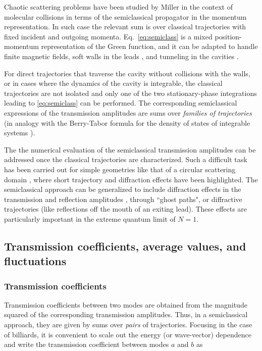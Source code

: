 \documentclass[a4paper,10pt]{article}
\newcommand{\nin}{\noindent}
\begin{document}
\nin Chaotic scattering problems have been studied by Miller \cite{Mil74} in the context of molecular collisions in terms of the semiclassical propagator in the momentum representation. In such case the relevant sum is over classical trajectories with fixed incident and outgoing momenta. 
Eq.~\eqref{eq:semiclass} is a mixed position-momentum representation of the Green function, and it can be adapted to handle finite magnetic fields, soft walls in the leads \cite{Bar91}, and tunneling in the cavities \cite{ingold}. 

\nin For direct trajectories that traverse the cavity without collisions with the walls, or in cases where the dynamics of the cavity is integrable, the classical trajectories are not isolated and only one of the two stationary-phase integrations leading to \eqref{eq:semiclass} can be performed. The corresponding semiclassical expressions of the  transmission amplitudes are sums over {\em families of trajectories} \cite{paul} (in analogy with the Berry-Tabor formula for the density of states of integrable systems \cite{ber76}). 

\nin The the numerical evaluation of the semiclassical transmission amplitudes can be addressed once the classical trajectories are characterized. Such a difficult task has been carried out for simple geometries like that of a circular scattering domain \cite{LinJen}, where short trajectory \cite{ishio95} and diffraction \cite{schwi96} effects have been highlighted. The semiclassical approach can be generalized to include diffraction effects in the transmission and reflection amplitudes \cite{vattay}, through ``ghost paths", or diffractive trajectories (like reflections off the mouth of an exiting lead). These effects are particularly important in the extreme quantum limit of $N\!=1\!$. 

\subsection{Transmission coefficients, average values, and fluctuations}

\subsubsection{Transmission coefficients}

Transmission coefficients between two modes are obtained from the magnitude squared of the corresponding transmission amplitudes. Thus, in a semiclassical approach, they are given by sums over {\it pairs} of trajectories. Focusing in the case of billiards, it is convenient to scale out the energy (or wave-vector) dependence and write the transmission coefficient between modes $a$ and $b$ as
\end{document}
